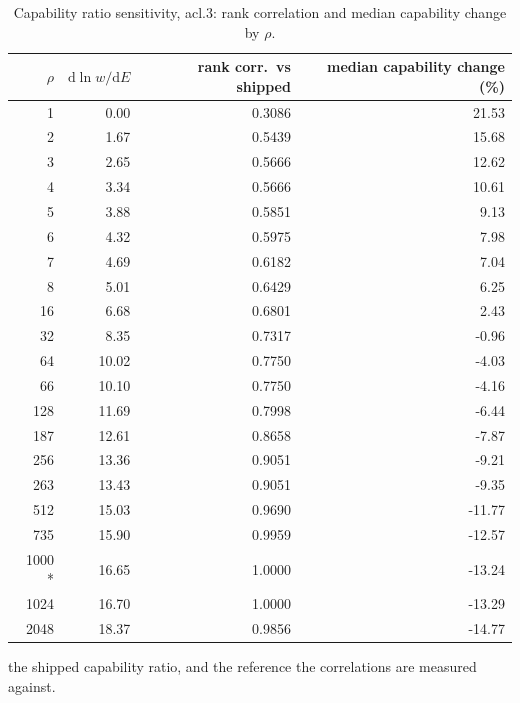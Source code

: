 \begin{table}[htbp]
  \centering
  \caption{Capability ratio sensitivity, acl.3: rank correlation and median capability change by $\rho$.}
  \label{tab:rho-acl-3-summary}
  \begin{tabular}{r r r r}
    \toprule
    $\rho$ & $\mathrm{d}\ln w/\mathrm{d}E$ & rank corr.\ vs shipped & median capability change (\%) \\
    \midrule
    1 & 0.00 & 0.3086 & 21.53 \\
    2 & 1.67 & 0.5439 & 15.68 \\
    3 & 2.65 & 0.5666 & 12.62 \\
    4 & 3.34 & 0.5666 & 10.61 \\
    5 & 3.88 & 0.5851 & 9.13 \\
    6 & 4.32 & 0.5975 & 7.98 \\
    7 & 4.69 & 0.6182 & 7.04 \\
    8 & 5.01 & 0.6429 & 6.25 \\
    16 & 6.68 & 0.6801 & 2.43 \\
    32 & 8.35 & 0.7317 & -0.96 \\
    64 & 10.02 & 0.7750 & -4.03 \\
    66 & 10.10 & 0.7750 & -4.16 \\
    128 & 11.69 & 0.7998 & -6.44 \\
    187 & 12.61 & 0.8658 & -7.87 \\
    256 & 13.36 & 0.9051 & -9.21 \\
    263 & 13.43 & 0.9051 & -9.35 \\
    512 & 15.03 & 0.9690 & -11.77 \\
    735 & 15.90 & 0.9959 & -12.57 \\
    1000 * & 16.65 & 1.0000 & -13.24 \\
    1024 & 16.70 & 1.0000 & -13.29 \\
    2048 & 18.37 & 0.9856 & -14.77 \\
    \bottomrule
  \end{tabular}
  \par\smallskip\footnotesize * the shipped capability ratio, and the reference the correlations are measured against.
\end{table}

